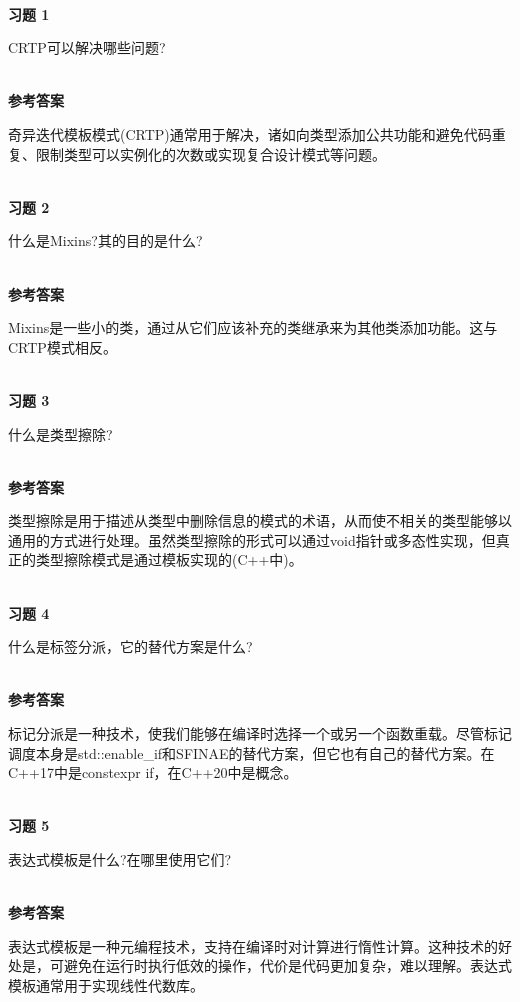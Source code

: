 \hspace*{\fill} \\ %
\noindent
\textbf{习题 1}

CRTP可以解决哪些问题?

\hspace*{\fill} \\ %
\noindent
\textbf{参考答案}

奇异迭代模板模式(CRTP)通常用于解决，诸如向类型添加公共功能和避免代码重复、限制类型可以实例化的次数或实现复合设计模式等问题。


\hspace*{\fill} \\ %
\noindent
\textbf{习题 2}

什么是Mixins?其的目的是什么?

\hspace*{\fill} \\ %
\noindent
\textbf{参考答案}

Mixins是一些小的类，通过从它们应该补充的类继承来为其他类添加功能。这与CRTP模式相反。

\hspace*{\fill} \\ %
\noindent
\textbf{习题 3}

什么是类型擦除?

\hspace*{\fill} \\ %
\noindent
\textbf{参考答案}

类型擦除是用于描述从类型中删除信息的模式的术语，从而使不相关的类型能够以通用的方式进行处理。虽然类型擦除的形式可以通过void指针或多态性实现，但真正的类型擦除模式是通过模板实现的(C++中)。

\hspace*{\fill} \\ %
\noindent
\textbf{习题 4}

什么是标签分派，它的替代方案是什么?

\hspace*{\fill} \\ %
\noindent
\textbf{参考答案}

标记分派是一种技术，使我们能够在编译时选择一个或另一个函数重载。尽管标记调度本身是std::enable\_if和SFINAE的替代方案，但它也有自己的替代方案。在C++17中是constexpr if，在C++20中是概念。

\hspace*{\fill} \\ %
\noindent
\textbf{习题 5}

表达式模板是什么?在哪里使用它们?

\hspace*{\fill} \\ %
\noindent
\textbf{参考答案}

表达式模板是一种元编程技术，支持在编译时对计算进行惰性计算。这种技术的好处是，可避免在运行时执行低效的操作，代价是代码更加复杂，难以理解。表达式模板通常用于实现线性代数库。












